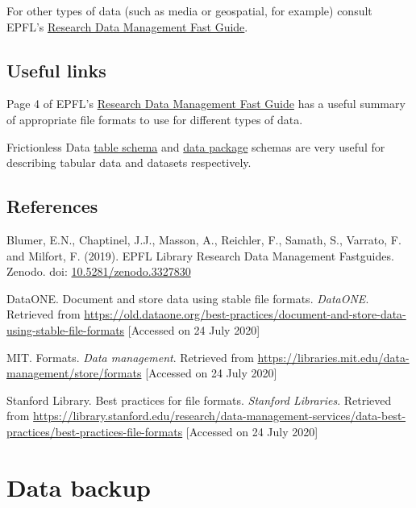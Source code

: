 \documentclass[a4paper,oneside]{report}
\begin{document}
For other types of data (such as media or geospatial, for example)
consult EPFL's
\href{https://www.epfl.ch/campus/library/wp-content/uploads/2019/09/EPFL_Library_RDM_FastGuide_All.pdf\#page=4}{Research
Data Management Fast Guide}.

\hypertarget{useful-links}{%
\section{Useful links}\label{useful-links}}

Page 4 of EPFL's
\href{https://www.epfl.ch/campus/library/wp-content/uploads/2019/09/EPFL_Library_RDM_FastGuide_All.pdf\#page=4}{Research
Data Management Fast Guide} has a useful summary of appropriate file
formats to use for different types of data.

Frictionless Data
\href{https://specs.frictionlessdata.io/table-schema/}{table schema} and
\href{https://specs.frictionlessdata.io/data-package/}{data package}
schemas are very useful for describing tabular data and datasets
respectively.

\hypertarget{references-3}{%
\section{References}\label{references-3}}

Blumer, E.N., Chaptinel, J.J., Masson, A., Reichler, F., Samath, S.,
Varrato, F. and Milfort, F. (2019). EPFL Library Research Data
Management Fastguides. Zenodo. doi:
\href{https://doi.org/10.5281/zenodo.3327830}{10.5281/zenodo.3327830}

DataONE. Document and store data using stable file formats.
\emph{DataONE}. Retrieved from
\url{https://old.dataone.org/best-practices/document-and-store-data-using-stable-file-formats}
{[}Accessed on 24 July 2020{]}

MIT. Formats. \emph{Data management}. Retrieved from
\href{https://libraries.mit.edu/data-management/store/formats/}{https://libraries.mit.edu/data-management/store/formats}
{[}Accessed on 24 July 2020{]}

Stanford Library. Best practices for file formats. \emph{Stanford
Libraries}. Retrieved from
\url{https://library.stanford.edu/research/data-management-services/data-best-practices/best-practices-file-formats}
{[}Accessed on 24 July 2020{]}

\hypertarget{data-backup}{%
\chapter{Data backup}\label{data-backup}}
\end{document}

